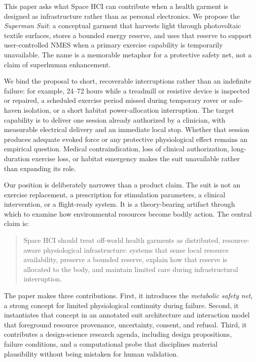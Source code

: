 \documentclass[runningheads]{llncs}
\begin{document}
This paper asks what Space HCI can contribute when a health garment is designed as infrastructure rather than as personal electronics. We propose the \emph{Superman Suit}: a conceptual garment that harvests light through photovoltaic textile surfaces, stores a bounded energy reserve, and uses that reserve to support user-controlled NMES when a primary exercise capability is temporarily unavailable. The name is a memorable metaphor for a protective safety net, not a claim of superhuman enhancement.

We bind the proposal to short, recoverable interruptions rather than an indefinite failure: for example, 24--72 hours while a treadmill or resistive device is inspected or repaired, a scheduled exercise period missed during temporary rover or safe-haven isolation, or a short habitat power-allocation interruption. The target capability is to deliver one session already authorized by a clinician, with measurable electrical delivery and an immediate local stop. Whether that session produces adequate evoked force or any protective physiological effect remains an empirical question. Medical contraindication, loss of clinical authorization, long-duration exercise loss, or habitat emergency makes the suit unavailable rather than expanding its role.

Our position is deliberately narrower than a product claim. The suit is not an exercise replacement, a prescription for stimulation parameters, a clinical intervention, or a flight-ready system. It is a theory-bearing artifact through which to examine how environmental resources become bodily action. The central claim is:

\begin{quote}
Space HCI should treat off-world health garments as distributed, resource-aware physiological infrastructure: systems that sense local resource availability, preserve a bounded reserve, explain how that reserve is allocated to the body, and maintain limited care during infrastructural interruption.
\end{quote}

The paper makes three contributions. First, it introduces the \emph{metabolic safety net}, a strong concept for limited physiological continuity during failure. Second, it instantiates that concept in an annotated suit architecture and interaction model that foreground resource provenance, uncertainty, consent, and refusal. Third, it contributes a design-science research agenda, including design propositions, failure conditions, and a computational probe that disciplines material plausibility without being mistaken for human validation.
\end{document}
